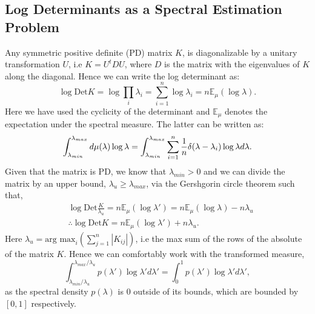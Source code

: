 \documentclass[letterpaper]{article} %
\begin{document}
\subsection{Log Determinants as a Spectral Estimation Problem}
Any symmetric positive definite (PD) matrix $K$, is diagonalizable by a unitary transformation $U$, i.e $K = U^{t}DU$, where $D$ is the matrix with the eigenvalues of $K$ along the diagonal. Hence we can write the log determinant as:
\begin{equation}
\log \text{Det} K = \log \prod_{i}\lambda_{i} = \sum_{i=1}^{n}\log\lambda_{i} = n\mathbb{E}_{\mu}(\log \lambda).
\end{equation} 
Here we have used the cyclicity of the determinant and $\mathbb{E}_{\mu}$ denotes the expectation under the spectral measure. The latter can be written as:
\begin{equation}
\label{eq:spectrallog}
 \int_{\lambda_{min}}^{\lambda_{max}}d\mu(\lambda)\log \lambda  \\  = \int_{\lambda_{min}}^{\lambda_{max}}\sum_{i=1}^{n}\frac{1}{n}\delta(\lambda-\lambda_{i})\log \lambda d\lambda.
\end{equation}
Given that the matrix is PD, we know that $\lambda_{min}>0$ and we can divide the matrix by an upper bound, $\lambda_{u} \geq \lambda_{max}$, via the Gershgorin circle theorem \cite{gershgorin1931uber} such that,
\begin{equation}
\begin{aligned}
& \log \text{Det} \frac{K}{\lambda_{u}} =  n\mathbb{E}_{\mu}(\log \lambda') =  n\mathbb{E}_{\mu}(\log \lambda) -  n\lambda_{u}\\
& \therefore \log \text{Det} K = n\mathbb{E}_{\mu}(\log \lambda') + n\lambda_{u}.
\end{aligned}
\end{equation}
Here $\lambda_{u} = \text{arg max}_{i}(\sum_{j=1}^{n}|K_{ij}|)$, i.e the max sum of the rows of the absolute of the matrix $K$. Hence we can comfortably work with the transformed measure,
\begin{equation}
\int_{\lambda_{min}/\lambda_{u}}^{\lambda_{max}/\lambda_{u}}p(\lambda')\log \lambda' d\lambda' = \int_{0}^{1}p(\lambda')\log \lambda' d\lambda',
\end{equation}
as the spectral density $p(\lambda)$ is $0$ outside of its bounds, which are bounded by $[0,1]$ respectively.
\end{document}
